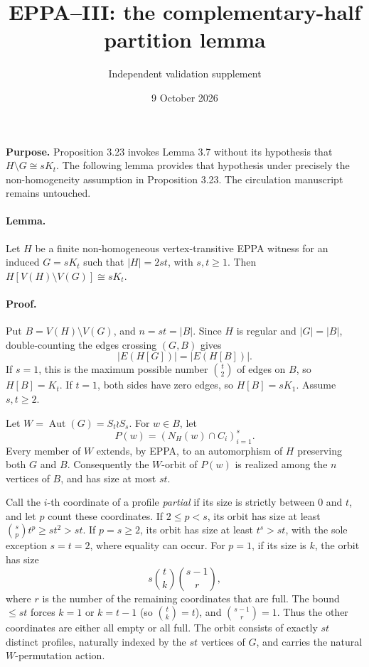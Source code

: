 \documentclass[11pt,a4paper]{article}
\title{EPPA--III: the complementary-half partition lemma}
\author{Independent validation supplement}
\date{9 October 2026}
\begin{document}
\maketitle

\noindent
\textbf{Purpose.} Proposition 3.23 invokes Lemma 3.7 without
its hypothesis that \(H\setminus G\cong sK_t\).
The following lemma provides that hypothesis under
precisely the non-homogeneity assumption in Proposition 3.23.
The circulation manuscript remains untouched.

\paragraph{Lemma.}
Let \(H\) be a finite non-homogeneous vertex-transitive
EPPA witness for an induced \(G=sK_t\) such that
\(|H|=2st\), with \(s,t\ge1\).
Then \(H[V(H)\setminus V(G)]\cong sK_t\).

\paragraph{Proof.}
Put \(B=V(H)\setminus V(G)\), and \(n=st=|B|\).
Since \(H\) is regular and \(|G|=|B|\),
double-counting the edges crossing \((G,B)\) gives
\[
                 |E(H[G])|=|E(H[B])|.        \tag{*}
\]
If \(s=1\), this is the maximum possible number
\(\binom t2\) of edges on \(B\), so \(H[B]=K_t\).
If \(t=1\), both sides have zero edges, so \(H[B]=sK_1\).
Assume \(s,t\ge2\).

Let \(W=\operatorname{Aut}(G)=S_t\wr S_s\).
For \(w\in B\), let
\[
             P(w)=(N_H(w)\cap C_i)_{i=1}^s.
\]
Every member of \(W\) extends, by EPPA, to an
automorphism of \(H\) preserving both \(G\) and \(B\).
Consequently the \(W\)-orbit of \(P(w)\) is
realized among the \(n\) vertices of \(B\), and
has size at most \(st\).

Call the \(i\)-th coordinate of a profile
\emph{partial} if its size is strictly between
\(0\) and \(t\), and let \(p\) count these coordinates.
If \(2\le p<s\), its orbit has size at least
\(\binom sp t^p\ge st^2>st\).
If \(p=s\ge2\), its orbit has size at least
\(t^s>st\), with the sole exception \(s=t=2\),
where equality can occur.
For \(p=1\), if its size is \(k\),
the orbit has size
\[
       s\binom tk\binom{s-1}{r},
\]
where \(r\) is the number of the remaining
coordinates that are full. The bound \(\le st\)
forces \(k=1\) or \(k=t-1\) (so \(\binom tk=t\)),
and \(\binom{s-1}{r}=1\). Thus the other
coordinates are either all empty or all full.
The orbit consists of exactly \(st\)
distinct profiles, naturally indexed by the
\(st\) vertices of \(G\), and carries the
natural \(W\)-permutation action.
\end{document}
